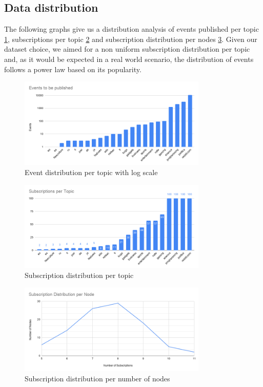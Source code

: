 \subsection{Data distribution}\label{subsec:data-distribution}

The following graphs give us a distribution analysis of events published per
topic \ref{fig:events-to-be-publisher-per-topic}, subscriptions per topic
\ref{fig:subscriptions-per-topic} and subscription distribution per nodes
\ref{fig:subscription-distribution-per-node}. Given our dataset choice, we
aimed for a non uniform subscription distribution per topic and, as it would be
expected in a real world scenario, the distribution of events follows a power
law based on its popularity. 

\begin{figure}[!htb]
  \centering
  \includegraphics[width=0.8\textwidth]{img/events-to-be-publisher-per-topic.png}
  \caption{Event distribution per topic with log scale}
  \label{fig:events-to-be-publisher-per-topic}
\end{figure}

\begin{figure}[!htb]
  \centering
  \includegraphics[width=0.8\textwidth]{img/subscriptions-per-topic.png}
  \caption{Subscription distribution per topic}
  \label{fig:subscriptions-per-topic}
\end{figure}

\begin{figure}[!htb]
  \centering
  \includegraphics[width=0.8\textwidth]{img/subscription-distribution-per-node.png}
  \caption{Subscription distribution per number of nodes}
  \label{fig:subscription-distribution-per-node}
\end{figure}

